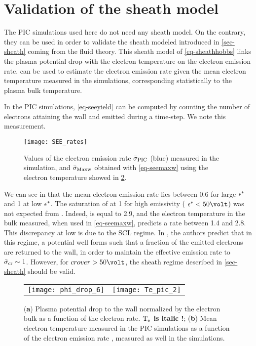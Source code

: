 
\section{Validation of the sheath model }
  \label{sec-sheath_validation}
  
  The \ac{PIC} simulations used here do not need any sheath model.
  On the contrary, they can be used in order to validate the sheath modeled introduced in \vref{sec-sheath} coming from the fluid theory.
  This sheath model of \vref{eq-sheathhobbs} links the plasma potential drop with the electron temperature on the electron emission rate.
   can be used to estimate the electron emission rate given the mean electron temperature measured in the simulations, corresponding statistically to the plasma bulk temperature.   
  
  In the \ac{PIC} simulations, \cref{eq-seeyield} can be computed by counting the number of electrons attaining the wall and emitted during a time-step.
  We note \ratepic this measurement.
   
   
  \begin{figure}[hbtp]
    \centering
    \texttt{[image: SEE\_rates]}
    \caption{Values of the electron emission rate $ \bar{\sigma }_{\rm PIC}$ (blue) measured in the simulation, and $  \bar{\sigma }_{\rm Maxw}$ obtained with \cref{eq-seemaxw} using the electron temperature showed in \cref{fig-Tevsproba}. }
    \label{fig-seeparamesMaxw}
  \end{figure}
  
  
  We can see in  that the mean electron emission rate lies between 0.6 for large $\epsilon^{*}$ and 1 at low $\epsilon^{*}$.
  The saturation of \ratepic at 1 for high emissivity ( $\crover < 50 \volt$) was not expected from \ratemaxw.
  Indeed, \probamax is equal to 2.9, and the electron temperature in the bulk measured, when used in \cref{eq-seemaxw}, predicts a rate between 1.4 and 2.8.
  This discrepancy at low \crover is due to the \ac{SCL} regime.
  In \citet{hobbs1967}, the authors predict that in this regime, a potential well forms such that a fraction of the emitted electrons are returned to the wall, in order to maintain the effective emission rate to $ \bar{\sigma }_{\rm cr}\sim1$.
  However, for $crover > 50 \volt$, the sheath regime described in \vref{sec-sheath} should be valid.
   
  \begin{figure}[hbtp]
    \centering
    \begin{tabular}{cc}
      \texttt{[image: phi\_drop\_6]}
      &
      \texttt{[image: Te\_pic\_2]}
    \end{tabular}
    \caption{({\bf a}) Plasma potential drop to the wall normalized by the electron bulk as a function of the electron rate. {\bf $\mathrm{T_e}$ is italic !}; ({\bf b}) Mean electron temperature measured in the \ac{PIC} simulations as a function of the electron emission rate \rate, measured as well in the simulations.  }
    \label{fig-Tevsproba}
  \end{figure}
  
